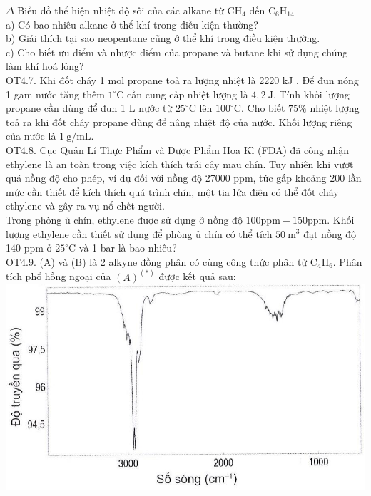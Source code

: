 \documentclass[10pt]{article}
\begin{document}
$\Delta$ Biểu đồ thể hiện nhiệt độ sôi của các alkane từ $\mathrm{CH}_{4}$ đến $\mathrm{C}_{6} \mathrm{H}_{14}$\\
a) Có bao nhiêu alkane ở thể khí trong điều kiện thường?\\
b) Giải thích tại sao neopentane cũng ở thể khí trong điều kiện thường.\\
c) Cho biết ưu điểm và nhược điểm của propane và butane khi sử dụng chúng làm khí hoá lỏng?\\
OT4.7. Khi đốt cháy 1 mol propane toả ra lượng nhiệt là 2220 kJ . Để đun nóng 1 gam nước tăng thêm $1^{\circ} \mathrm{C}$ cần cung cấp nhiệt lượng là $4,2 \mathrm{~J}$. Tính khối lượng propane cần dùng để đun 1 L nước từ $25^{\circ} \mathrm{C}$ lên $100^{\circ} \mathrm{C}$. Cho biết $75 \%$ nhiệt lượng toả ra khi đốt cháy propane dùng để nâng nhiệt độ của nước. Khối lượng riêng của nước là $1 \mathrm{~g} / \mathrm{mL}$.\\
OT4.8. Cục Quản Lí Thực Phẩm và Dược Phẩm Hoa Kì (FDA) đã công nhận ethylene là an toàn trong việc kích thích trái cây mau chín. Tuy nhiên khi vượt quá nồng độ cho phép, ví dụ đối với nồng độ 27000 ppm, tức gấp khoảng 200 lần mức cần thiết để kích thích quá trình chín, một tia lửa điện có thể đốt cháy ethylene và gây ra vụ nổ chết người.\\
Trong phòng ủ chín, ethylene được sử dụng ở nồng độ $100 \mathrm{ppm}-150 \mathrm{ppm}$. Khối lượng ethylene cần thiết sử dụng để phòng ủ chín có thể tích $50 \mathrm{~m}^{3}$ đạt nồng độ 140 ppm ở $25^{\circ} \mathrm{C}$ và 1 bar là bao nhiêu?\\
OT4.9. (A) và (B) là 2 alkyne đồng phân có cùng công thức phân tử $\mathrm{C}_{4} \mathrm{H}_{6}$. Phân tích phổ hồng ngoại của $(A)^{(*)}$ được kết quả sau:\\
\includegraphics[max width=\textwidth, center]{2025_10_23_ae7aef68fb3b41082d29g-32(1)}
\end{document}
